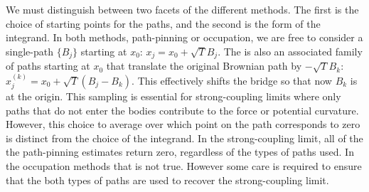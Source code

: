 
We must distinguish between two facets of the different methods.
The first is the choice of starting points for the paths, and the second is the form of the integrand.  In both methods, path-pinning
or occupation, we are free to consider a single-path $\{B_j\}$ starting at $x_0$: $x_j=x_0+\sqrt{T}B_j$.
The is also an associated family of paths starting at $x_0$ that translate the original Brownian path
by $-\sqrt{T}B_k$: $x^{(k)}_j = x_0+\sqrt{T}(B_j-B_k)$.  This effectively shifts the bridge so that now 
$B_k$ is at the origin.  This sampling is essential for strong-coupling limits where only paths that do 
not enter the bodies contribute to the force or potential curvature.  
However, this choice to average over which point on the path corresponds to zero is distinct from the choice 
of the integrand.   In the strong-coupling limit, all of the the path-pinning estimates 
return zero, regardless of the types of paths used.  
In the occupation methods that is not true.  However some care is required to ensure that the both types of paths are 
used to recover the strong-coupling limit.  




